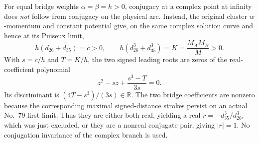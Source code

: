 \documentclass[11pt]{amsart}
\theoremstyle{remark}
\begin{document}
For equal bridge weights $\alpha=\beta=h>0$, conjugacy at a complex point at infinity does \emph{not} follow from conjugacy on the physical arc. Instead, the original cluster $w$-momentum and constant potential give, on the same complex solution curve and hence at its Puiseux limit,
\[
h(d_{26}+d_{35})=c>0,\qquad h(d_{26}^3+d_{35}^3)=K=\frac{M_AM_B}{M}>0.
\]
With $s=c/h$ and $T=K/h$, the two signed leading roots are zeros of the real-coefficient polynomial
\[
z^2-sz+\frac{s^3-T}{3s}=0.
\]
Its discriminant is $(4T-s^3)/(3s)\in\mathbb R$. The two bridge coefficients are nonzero because the corresponding maximal signed-distance strokes persist on an actual No.~79 first limit. Thus they are either both real, yielding a real $r=-d_{35}^3/d_{26}^3$, which was just excluded, or they are a nonreal conjugate pair, giving $|r|=1$. No conjugation invariance of the complex branch is used.
\end{document}
